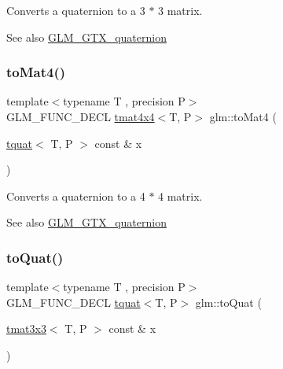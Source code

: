Converts a quaternion to a 3 $\ast$ 3 matrix.

\begin{DoxySeeAlso}{See also}
\hyperlink{group__gtx__quaternion}{G\+L\+M\+\_\+\+G\+T\+X\+\_\+quaternion} 
\end{DoxySeeAlso}
\mbox{\label{group__gtx__quaternion_gaedc9fba6485eade37cc26c16df9d7aad}} 
\subsubsection{\texorpdfstring{to\+Mat4()}{toMat4()}}
{\footnotesize\ttfamily template$<$typename T , precision P$>$ \\
G\+L\+M\+\_\+\+F\+U\+N\+C\+\_\+\+D\+E\+CL \hyperlink{structglm_1_1tmat4x4}{tmat4x4}$<$T, P$>$ glm\+::to\+Mat4 (\begin{DoxyParamCaption}\item[{\hyperlink{structglm_1_1tquat}{tquat}$<$ T, P $>$ const \&}]{x }\end{DoxyParamCaption})}

Converts a quaternion to a 4 $\ast$ 4 matrix.

\begin{DoxySeeAlso}{See also}
\hyperlink{group__gtx__quaternion}{G\+L\+M\+\_\+\+G\+T\+X\+\_\+quaternion} 
\end{DoxySeeAlso}
\mbox{\label{group__gtx__quaternion_gac9e3109ca60b644ce508d6b71a1697bc}} 
\subsubsection{\texorpdfstring{to\+Quat()}{toQuat()}\hspace{0.1cm}{\footnotesize\ttfamily [1/2]}}
{\footnotesize\ttfamily template$<$typename T , precision P$>$ \\
G\+L\+M\+\_\+\+F\+U\+N\+C\+\_\+\+D\+E\+CL \hyperlink{structglm_1_1tquat}{tquat}$<$T, P$>$ glm\+::to\+Quat (\begin{DoxyParamCaption}\item[{\hyperlink{structglm_1_1tmat3x3}{tmat3x3}$<$ T, P $>$ const \&}]{x }\end{DoxyParamCaption})}

